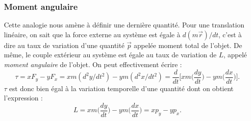 \subsubsection{Moment angulaire}
Cette analogie nous amène à définir une dernière quantité. Pour une translation linéaire, on sait que la force externe au système est égale à $d(m\vec{r})/dt$, c'est à dire au taux de variation d'une quantité $\vec{p}$ appelée moment total de l'objet. De même, le couple extérieur au système est égale au taux de variation de $L$, appelé \textit{moment angulaire} de l'objet. On peut effectivement écrire :
\begin{equation}
\tau = xF_y-yF_x = xm(d^2y/dt^2)-ym(d^2x/dt^2) = \frac{d}{dt}\biggl[xm\biggl(\frac{dy}{dt}\biggr) - ym\biggl(\frac{dx}{dt}\biggr)\biggr].
\end{equation}
$\tau$ est donc bien égal à la variation temporelle d'une quantité dont on obtient l'expression :
\begin{equation}
L = xm\biggl(\frac{dy}{dt}\biggr) - ym\biggl(\frac{dx}{dt}\biggr) = xp_y - yp_x.
\end{equation}
